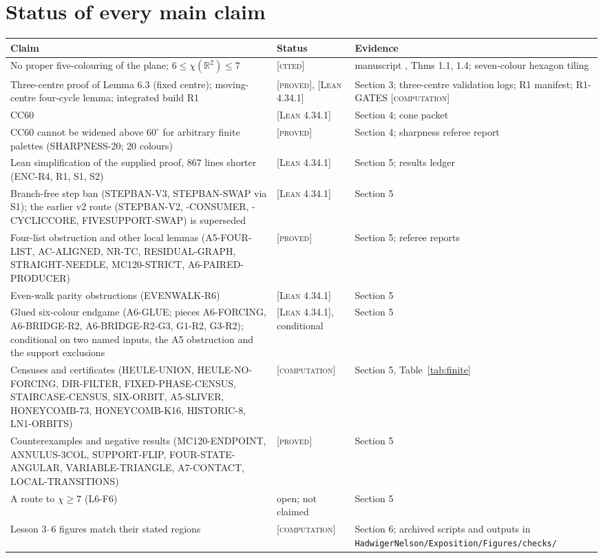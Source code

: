 \documentclass[11pt]{article}
\theoremstyle{definition}
\theoremstyle{remark}
\newcommand{\R}{\mathbb{R}}
\newcommand{\st}[1]{\textsc{[#1]}}
\begin{document}
\section{Status of every main claim}
\begin{center}\small
\begin{tabularx}{\linewidth}{@{}X l X@{}}
\toprule
Claim & Status & Evidence\\
\midrule
No proper five-colouring of the plane; $6\le\chi(\R^2)\le7$ & \st{cited} & manuscript \cite{OAI}, Thms 1.1, 1.4; seven-colour hexagon tiling\\
Three-centre proof of Lemma 6.3 (fixed centre); moving-centre four-cycle lemma; integrated build R1 & \st{proved}, \st{Lean 4.34.1} & Section 3; three-centre validation logs; R1 manifest; R1-GATES \st{computation}\\
CC60 & \st{Lean 4.34.1} & Section 4; cone packet\\
CC60 cannot be widened above $60^\circ$ for arbitrary finite palettes (SHARPNESS-20; 20 colours) & \st{proved} & Section 4; sharpness referee report\\
Lean simplification of the supplied proof, 867 lines shorter (ENC-R4, R1, S1, S2) & \st{Lean 4.34.1} & Section 5; results ledger\\
Branch-free step ban (STEPBAN-V3, STEPBAN-SWAP via S1); the earlier v2 route (STEPBAN-V2, -CONSUMER, -CYCLICCORE, FIVESUPPORT-SWAP) is superseded & \st{Lean 4.34.1} & Section 5\\
Four-list obstruction and other local lemmas (A5-FOUR-LIST, AC-ALIGNED, NR-TC, RESIDUAL-GRAPH, STRAIGHT-NEEDLE, MC120-STRICT, A6-PAIRED-PRODUCER) & \st{proved} & Section 5; referee reports\\
Even-walk parity obstructions (EVENWALK-R6) & \st{Lean 4.34.1} & Section 5\\
Glued six-colour endgame (A6-GLUE; pieces A6-FORCING, A6-BRIDGE-R2, A6-BRIDGE-R2-G3, G1-R2, G3-R2); conditional on two named inputs, the A5 obstruction and the support exclusions & \st{Lean 4.34.1}, conditional & Section 5\\
Censuses and certificates (HEULE-UNION, HEULE-NO-FORCING, DIR-FILTER, FIXED-PHASE-CENSUS, STAIRCASE-CENSUS, SIX-ORBIT, A5-SLIVER, HONEYCOMB-73, HONEYCOMB-K16, HISTORIC-8, LN1-ORBITS) & \st{computation} & Section 5, Table~\ref{tab:finite}\\
Counterexamples and negative results (MC120-ENDPOINT, ANNULUS-3COL, SUPPORT-FLIP, FOUR-STATE-ANGULAR, VARIABLE-TRIANGLE, A7-CONTACT, LOCAL-TRANSITIONS) & \st{proved} & Section 5\\
A route to $\chi\ge7$ (L6-F6) & open; not claimed & Section 5\\
Lesson 3--6 figures match their stated regions & \st{computation} & Section 6; archived scripts and outputs in \texttt{HadwigerNelson/\allowbreak{}Exposition/\allowbreak{}Figures/\allowbreak{}checks/\allowbreak{}}\\
\bottomrule
\end{tabularx}
\end{center}
\end{document}

